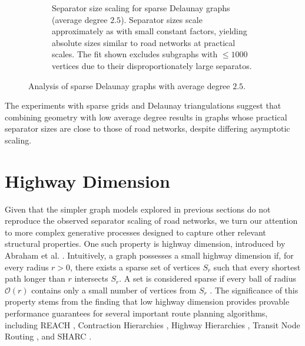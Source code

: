 \begin{figure}[tbhp]
\begin{subfigure}{0.55\linewidth}
		\caption{Separator size scaling for sparse Delaunay graphs (average degree \(2.5\)). Separator sizes scale approximately as  with small constant factors, yielding absolute sizes similar to road networks at practical scales. The fit shown excludes subgraphs with \( \le 1000 \) vertices due to their disproportionately large separatos.}
		\label{fig:sparse_delaunay_sep_plot}
	\end{subfigure}
	\caption{Analysis of sparse Delaunay graphs with average degree \(2.5\).}
	\label{fig:sparse_delaunay_separators}
\end{figure}

The experiments with sparse grids and Delaunay triangulations suggest that combining geometry with low average degree results in graphs whose practical separator sizes are close to those of road networks, despite differing asymptotic scaling.

\section{Highway Dimension}
\label{sec:synthetic:highway_dimension}

Given that the simpler graph models explored in previous sections do not reproduce the observed  separator scaling of road networks, we turn our attention to more complex generative processes designed to capture other relevant structural properties.
One such property is highway dimension, introduced by Abraham et al. \cite{abraham_highway_2010}.
Intuitively, a graph possesses a small highway dimension if, for every radius \(r > 0\), there exists a sparse set of vertices \(S_r\) such that every shortest path longer than \(r\) intersects \(S_r\).
A set is considered sparse if every ball of radius \(\mathcal{O}(r)\) contains only a small number of vertices from \(S_r\) \cite{abraham_highway_2010}.
The significance of this property stems from the finding that low highway dimension provides provable performance guarantees for several important route planning algorithms, including REACH \cite{goldberg_reach_2006}, Contraction Hierarchies \cite{geisberger_contraction_2008}, Highway Hierarchies \cite{sanders_highway_2005}, Transit Node Routing \cite{bast_fast_2007}, and SHARC \cite{bauer_sharc_2010}.

